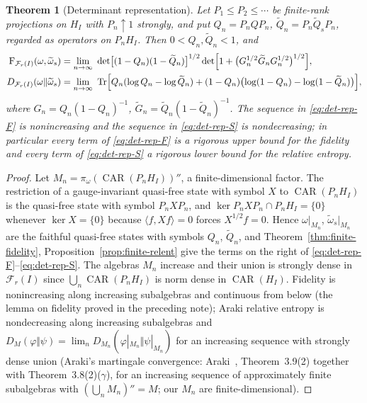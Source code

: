 \documentclass[11pt]{article}
\theoremstyle{accent}
\newtheorem{theorem}{Theorem}[section]
\theoremstyle{definition}
\newcommand{\cF}{\mathcal{F}}
\newcommand{\CAR}{\operatorname{CAR}}
\newcommand{\Tr}{\operatorname{Tr}}
\newcommand{\Fid}{\operatorname{F}}
\begin{document}
\begin{theorem}[Determinant representation]\label{thm:det-rep}
Let \(P_1\le P_2\le\cdots\) be finite-rank projections on \(H_I\) with \(P_n\uparrow1\) strongly, and put \(Q_n=P_nQP_n\), \(\widetilde Q_n=P_n\widetilde Q_sP_n\), regarded as operators on \(P_nH_I\).  Then \(0<Q_n,\widetilde Q_n<1\), and
\begin{align}
 \Fid_{\cF_r(I)}(\omega,\widetilde\omega_s)
 &=\lim_{n\to\infty}\ \det\bigl[(1-Q_n)(1-\widetilde Q_n)\bigr]^{1/2}
   \det\Bigl[1+\bigl(G_n^{1/2}\widetilde G_nG_n^{1/2}\bigr)^{1/2}\Bigr],
 \label{eq:det-rep-F}\\
 D_{\cF_r(I)}(\omega\Vert\widetilde\omega_s)
 &=\lim_{n\to\infty}\ \Tr\Bigl[Q_n(\log Q_n-\log\widetilde Q_n)+(1-Q_n)\bigl(\log(1-Q_n)-\log(1-\widetilde Q_n)\bigr)\Bigr],
 \label{eq:det-rep-S}
\end{align}
where \(G_n=Q_n(1-Q_n)^{-1}\), \(\widetilde G_n=\widetilde Q_n(1-\widetilde Q_n)^{-1}\).  The sequence in \eqref{eq:det-rep-F} is nonincreasing and the sequence in \eqref{eq:det-rep-S} is nondecreasing; in particular every term of \eqref{eq:det-rep-F} is a rigorous upper bound for the fidelity and every term of \eqref{eq:det-rep-S} a rigorous lower bound for the relative entropy.
\end{theorem}

\begin{proof}
Let \(M_n=\pi_\omega(\CAR(P_nH_I))''\), a finite-dimensional factor.  The restriction of a gauge-invariant quasi-free state with symbol \(X\) to \(\CAR(P_nH_I)\) is the quasi-free state with symbol \(P_nXP_n\), and \(\ker P_nXP_n\cap P_nH_I=\{0\}\) whenever \(\ker X=\{0\}\) because \(\langle f,Xf\rangle=0\) forces \(X^{1/2}f=0\).  Hence \(\omega|_{M_n}\), \(\widetilde\omega_s|_{M_n}\) are the faithful quasi-free states with symbols \(Q_n\), \(\widetilde Q_n\), and Theorem~\ref{thm:finite-fidelity}, Proposition~\ref{prop:finite-relent} give the terms on the right of \eqref{eq:det-rep-F}--\eqref{eq:det-rep-S}.  The algebras \(M_n\) increase and their union is strongly dense in \(\cF_r(I)\) since \(\bigcup_n\CAR(P_nH_I)\) is norm dense in \(\CAR(H_I)\).  Fidelity is nonincreasing along increasing subalgebras and continuous from below (the lemma on fidelity proved in the preceding note); Araki relative entropy is nondecreasing along increasing subalgebras and \(D_M(\varphi\Vert\psi)=\lim_nD_{M_n}(\varphi|_{M_n}\Vert\psi|_{M_n})\) for an increasing sequence with strongly dense union (Araki's martingale convergence: Araki~\cite{Araki77}, Theorem~3.9(2) together with Theorem~3.8(2)(\(\gamma\)), for an increasing sequence of approximately finite subalgebras with \((\bigcup_nM_n)''=M\); our \(M_n\) are finite-dimensional).
\end{proof}
\end{document}
